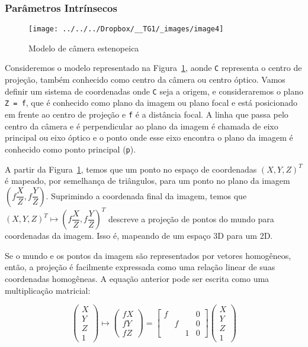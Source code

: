 \documentclass[ecp,tc]{iiufrgs}
\begin{document}
\subsubsection{Parâmetros Intrínsecos}

\begin{figure}
	\centering
	\caption{Modelo de câmera estenopeica}
	\texttt{[image: ../../../Dropbox/\_\_TG1/\_images/image4]}
	\label{fig:image4}
\end{figure}

Consideremos o modelo representado na Figura~\ref{fig:image4}, aonde \texttt{C} representa o centro de projeção, também conhecido como centro da câmera ou centro óptico. Vamos definir um sistema de coordenadas onde \texttt{C} seja a origem, e consideraremos o plano \texttt{Z = f}, que é conhecido como plano da imagem ou plano focal e está posicionado em frente ao centro de projeção e \texttt{f} é a distância focal. A linha que passa pelo centro da câmera e é perpendicular ao plano da imagem é chamada de eixo principal ou eixo óptico e o ponto onde esse eixo encontra o plano da imagem é conhecido como ponto principal (\texttt{p}).

A partir da Figura~\ref{fig:image4}, temos que um ponto no espaço de coordenadas $(X, Y, Z)^T$ é mapeado, por semelhança de triângulos, para um ponto no plano da imagem $ (f\dfrac{X}{Z}, f\dfrac{Y}{Z}) $.
Suprimindo a coordenada final da imagem, temos que $ (X, Y, Z)^T \mapsto (f\dfrac{X}{Z}, f\dfrac{Y}{Z})^T $ descreve  a  projeção  de  pontos  do  mundo  para  coordenadas  da  imagem.  Isso  é, mapeando de um espaço 3D para um 2D.

Se o mundo e os pontos da imagem são representados por vetores homogêneos, então, a projeção é facilmente expressada como uma relação linear de suas coordenadas homogêneas. A equação anterior pode ser escrita como uma multiplicação matricial:

\[\begin{pmatrix} X \\ Y \\ Z \\ 1 \end{pmatrix} \mapsto \begin{pmatrix} fX \\ fY \\ fZ \end{pmatrix} = \begin{bmatrix} f &  &  & 0 \\ & f & & 0 \\ & & 1 & 0 \end{bmatrix} \begin{pmatrix} X \\ Y \\ Z \\ 1 \end{pmatrix} \]
\end{document}
